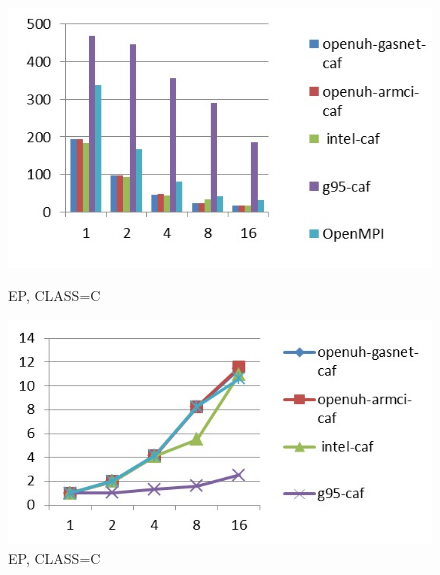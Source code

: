 \begin{figure}[ht]
\begin{minipage}[b]{0.45\linewidth}
\centering
\includegraphics[width=\textwidth]{./figures/ep_C_time.jpg}
\caption{EP, CLASS=C}
\label{fig:figure1}
\end{minipage}
\hspace{0.5cm}
\begin{minipage}[b]{0.45\linewidth}
\centering
\includegraphics[width=\textwidth]{./figures/ep_C_scalability.jpg}
\caption{EP, CLASS=C}
\label{fig:figure2}
\end{minipage}
\end{figure}





